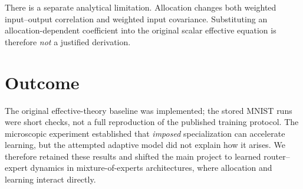\documentclass[11pt]{article}
\begin{document}
There is a separate analytical limitation. Allocation changes
both weighted input--output correlation and weighted input
covariance. Substituting an allocation-dependent coefficient
into the original scalar effective equation is therefore
\emph{not} a justified derivation.

\section*{Outcome}

The original effective-theory baseline was implemented;
the stored MNIST runs were short checks, not a full
reproduction of the published training protocol.
The microscopic experiment established that
\emph{imposed} specialization can accelerate learning,
but the attempted adaptive model did not explain how it
arises. We therefore retained these results and
shifted the main project to learned router--expert
dynamics in mixture-of-experts architectures, where
allocation and learning interact directly.



\end{document}
